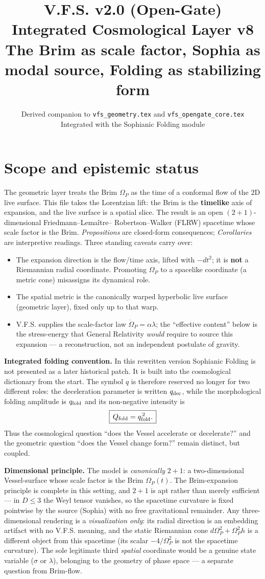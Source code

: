 \documentclass[11pt,a4paper]{article}
\title{\textbf{V.F.S. v2.0 (Open-Gate)}\\Integrated Cosmological Layer v8\\
\large The Brim as scale factor, Sophia as modal source, Folding as stabilizing form}
\author{Derived companion to \texttt{vfs\_geometry.tex} and \texttt{vfs\_opengate\_core.tex}\\
\small Integrated with the Sophianic Folding module}
\date{}
\newcommand{\VFS}{V.F.S.}
\newcommand{\Op}{\Omega_P}
\newcommand{\qdec}{q_{\rm dec}}
\newcommand{\qfold}{q_{\rm fold}}
\newcommand{\Qfold}{Q_{\rm fold}}
\theoremstyle{plain}
\theoremstyle{remark}
\theoremstyle{definition}
\begin{document}
\maketitle

\section*{Scope and epistemic status}
The geometric layer treats the Brim $\Op$ as the time of a conformal flow of the $2$D live surface.
This file takes the Lorentzian lift: the Brim is the \textbf{timelike} axis of expansion, and the live
surface is a spatial slice. The result is an open $(2{+}1)$-dimensional Friedmann--Lema\^itre--
Robertson--Walker (FLRW) spacetime whose scale factor is the Brim. \emph{Propositions} are closed-form
consequences; \emph{Corollaries} are interpretive readings. Three standing caveats carry over:
\begin{itemize}[leftmargin=1.4em,itemsep=2pt]
\item The expansion direction is the flow/time axis, lifted with $-dt^2$; it is \textbf{not} a
Riemannian radial coordinate. Promoting $\Op$ to a spacelike coordinate (a metric cone) misassigns its
dynamical role.
\item The spatial metric is the canonically warped hyperbolic live surface (geometric layer), fixed
only up to that warp.
\item \VFS{} supplies the scale-factor law $\dot\Op=\alpha\lambda$; the ``effective content'' below is
the stress-energy that General Relativity \emph{would} require to source this expansion --- a
reconstruction, not an independent postulate of gravity.
\end{itemize}

\noindent\textbf{Integrated folding convention.} In this rewritten version Sophianic Folding is not
presented as a later historical patch. It is built into the cosmological dictionary from the start.
The symbol $q$ is therefore reserved no longer for two different roles: the deceleration parameter is
written $\qdec$, while the morphological folding amplitude is $\qfold$ and its non-negative intensity
is
\[
\boxed{\,\Qfold=\qfold^{\,2}.\,}
\]
Thus the cosmological question ``does the Vessel accelerate or decelerate?'' and the geometric
question ``does the Vessel change form?'' remain distinct, but coupled.

\noindent\textbf{Dimensional principle.} The model is \emph{canonically} $2{+}1$: a two-dimensional
Vessel-surface whose scale factor is the Brim $\Op(t)$. The Brim-expansion principle is complete in
this setting, and $2{+}1$ is apt rather than merely sufficient --- in $D\le3$ the Weyl tensor vanishes,
so the spacetime curvature is fixed pointwise by the source (Sophia) with no free gravitational
remainder. Any three-dimensional rendering is a \emph{visualization only}: its radial direction is an
embedding artifact with no \VFS{} meaning, and the static Riemannian cone $d\Op^2+\Op^2h$ is a
different object from this spacetime (its scalar $-4/\Op^2$ is not the spacetime curvature). The sole
legitimate third \emph{spatial} coordinate would be a genuine state variable ($\sigma$ or $\lambda$),
belonging to the geometry of phase space --- a separate question from Brim-flow.
\end{document}
